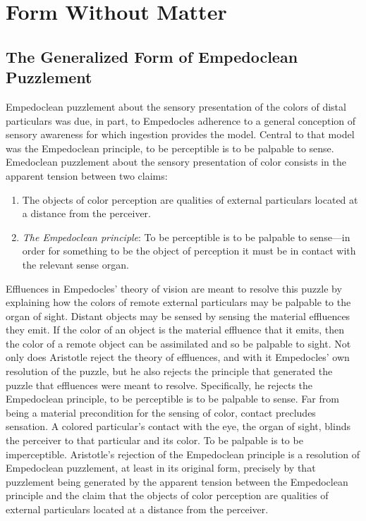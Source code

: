 \chapter{Form Without Matter} %
\label{cha:form_without_matter}

\section{The Generalized Form of Empedoclean Puzzlement} %
\label{sec:the_generalized_form_of_empedoclean_puzzlement}

Empedoclean puzzlement about the sensory presentation of the colors of distal particulars was due, in part, to Empedocles adherence to a general conception of sensory awareness for which ingestion provides the model. Central to that model was the Empedoclean principle, to be perceptible is to be palpable to sense. Emedoclean puzzlement about the sensory presentation of color consists in the apparent tension between two claims:
\begin{enumerate}[(1)]
    \item The objects of color perception are qualities of external particulars located at a distance from the perceiver.
    \item \emph{The Empedoclean principle}: To be perceptible is to be palpable to sense---in order for something to be the object of perception it must be in contact with the relevant sense organ.
\end{enumerate}
Effluences in Empedocles' theory of vision are meant to resolve this puzzle by explaining how the colors of remote external particulars may be palpable to the organ of sight. Distant objects may be sensed by sensing the material effluences they emit. If the color of an object is the material effluence that it emits, then the color of a remote object can be assimilated and so be palpable to sight. Not only does Aristotle reject the theory of effluences, and with it Empedocles' own resolution of the puzzle, but he also rejects the principle that generated the puzzle that effluences were meant to resolve. Specifically, he rejects the Empedoclean principle, to be perceptible is to be palpable to sense. Far from being a material precondition for the sensing of color, contact precludes sensation. A colored particular's contact with the eye, the organ of sight, blinds the perceiver to that particular and its color. To be palpable is to be imperceptible. Aristotle's rejection of the Empedoclean principle is a resolution of Empedoclean puzzlement, at least in its original form, precisely by that puzzlement being generated by the apparent tension between the Empedoclean principle and the claim that the objects of color perception are qualities of external particulars located at a distance from the perceiver.

